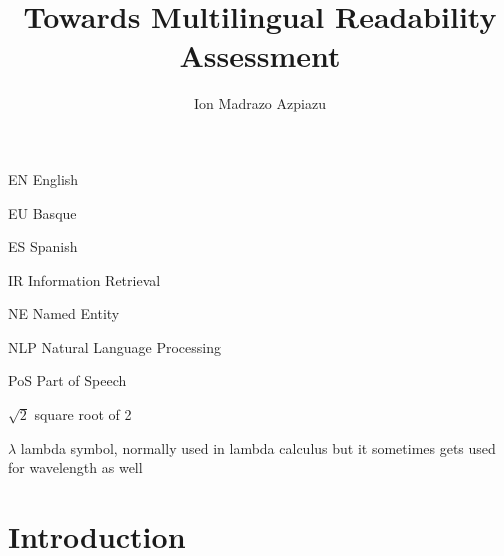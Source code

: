 \documentclass{bsu-ms}
\title{Towards Multilingual Readability Assessment}
\author{Ion Madrazo Azpiazu}
\begin{document}
\frontmatter  %

\buildFrontPages %

\begin{listAbbreviations}
  \item[EN] English
  \item[EU] Basque 
  \item[ES] Spanish 
  \item[IR] Information Retrieval
  \item[NE] Named Entity
  \item[NLP] Natural Language Processing
  \item[PoS] Part of Speech

\end{listAbbreviations}


\begin{listSymbols}
  \item[$\sqrt{2}$] square root of 2
  \item[$\lambda$] lambda symbol, normally used in lambda calculus but
    it sometimes gets used for wavelength as well
\end{listSymbols}



\mainmatter


%
%

\chapter{Introduction}

\end{document}
